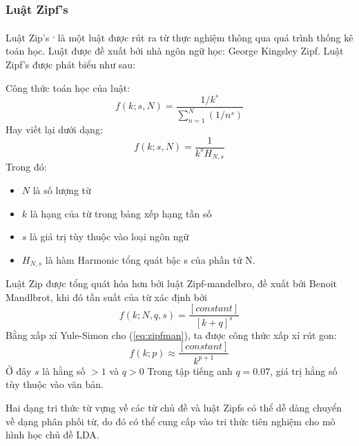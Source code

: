 \documentclass[fontsize=13pt]{scrartcl}
\begin{document}
\subsubsection{Luật Zipf’s}
Luật Zip’s \textsuperscript{\cite{zipf2},\cite{zipflaw}} là một luật được rút ra từ thực nghiệm thông qua quá trình thống kê toán học. Luật được đề xuất bởi nhà ngôn ngữ học: George Kingsley Zipf. Luật Zipf’s được phát biểu như sau:\\[0.4cm]
\begin{center}
\end{center}
 Công thức toán học của luật:
\begin{equation}
f(k;s,N) = \frac{1/k^s}{\sum_{n=1}^N(1/n^s)}
\end{equation}
Hay viết lại dưới dạng:
\begin{equation}
f(k;s,N) = \frac{1}{k^sH_{N,s}}
\end{equation}
Trong đó:
\begin{center}
\begin{itemize}
\item $N$ là số lượng từ
\item $k$ là hạng của từ trong bảng xếp hạng tần số
\item $s$ là giá trị tùy thuộc vào loại ngôn ngữ
\item $H_{N,s}$ là hàm Harmonic tổng quát bậc s của phần tử N.
\end{itemize}
\end{center}

Luật Zip được tổng quát hóa hơn bởi luật Zipf-mandelbro, đề xuất bởi Benoit Mandlbrot, khi đó tần suất của từ xác định bởi
\begin{equation} \label{eq:zipfman}
f(k;N,q,s) = \frac{[constant]}{[k+q]^s}
\end{equation}
Bằng xấp xỉ Yule-Simon cho (\ref{eq:zipfman}), ta được công thức xấp xỉ rút gon:
\begin{equation}\label{eq:zipex}
f(k;p) \approx \frac{[constant]}{k^{p+1}}
\end{equation}
Ở đây $s$ là hằng số $>1$ và $q>0$
Trong tập tiếng anh  $q = 0.07$, giá trị hằng số tùy thuộc vào văn bản.
\par
Hai dạng tri thức từ vựng về các từ chủ đề và luật Zipfs có thể dễ dàng chuyển về dạng phân phối từ, do đó có thể cung cấp vào tri thức tiên nghiệm cho mô hình học chủ đề LDA.
\end{document}
